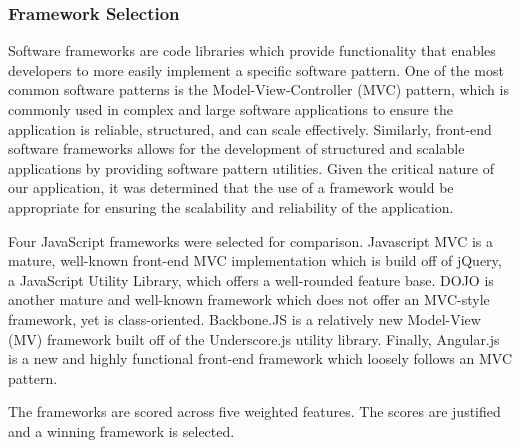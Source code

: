 \documentclass{report}
\begin{document}
\subsubsection{Framework Selection}

Software frameworks are code libraries which provide functionality that enables developers to more easily implement a specific software pattern. One of the most common software patterns is the Model-View-Controller (MVC) pattern, which is commonly used in complex and large software applications to ensure the application is reliable, structured, and can scale effectively. Similarly, front-end software frameworks allows for the development of structured and scalable applications by providing software pattern utilities. Given the critical nature of our application, it was determined that the use of a framework would be appropriate for ensuring the scalability and reliability of the application.

Four JavaScript frameworks were selected for comparison. Javascript MVC is a mature, well-known front-end MVC implementation which is build off of jQuery, a JavaScript Utility Library, which offers a well-rounded feature base. DOJO is another mature and well-known framework which does not offer an MVC-style framework, yet is class-oriented. Backbone.JS is a relatively new Model-View (MV) framework built off of the Underscore.js utility library. Finally, Angular.js is a new and highly functional front-end framework which loosely follows an MVC pattern.

The frameworks are scored across five weighted features. The scores are justified and a winning framework is selected.
\end{document}
